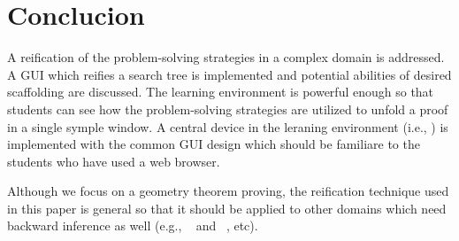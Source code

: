 
\section{Conclucion}

A reification of the problem-solving strategies in a complex domain is
addressed.  A GUI which reifies a search tree is implemented and
potential abilities of desired scaffolding are discussed.  The learning
environment is powerful enough so that students can see how the
problem-solving strategies are utilized to unfold a proof in a single
symple window.  A central device in the leraning environment (i.e.,
\StateView) is implemented with the common GUI design which should be
familiare to the students who have used a web browser.

Although we focus on a geometry theorem proving, the reification
technique used in this paper is general so that it should be applied to
other domains which need backward inference as well (e.g., \ProofTutor\
\cite{Scheines94} and \AlgebraTutor\ \cite{WhoIsIt}, etc).  

